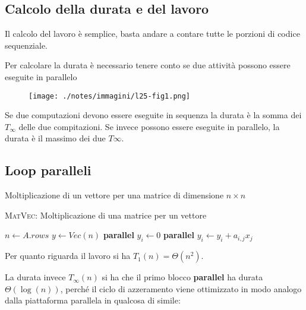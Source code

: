 
\subsection{Calcolo della durata e del lavoro}\label{calcolo-della-durata-e-del-lavoro}

Il calcolo del lavoro è semplice, basta andare a contare tutte le porzioni di codice sequenziale.

Per calcolare la durata è necessario tenere conto se due attività possono essere eseguite in parallelo

\begin{figure}[htbp]
\centering
\texttt{[image: ./notes/immagini/l25-fig1.png]}
\caption{}
\end{figure}

Se due computazioni devono essere eseguite in sequenza la durata è la somma dei $T_\infty$ delle due compitazioni. Se invece possono essere eseguite in parallelo, la durata è il massimo dei due $T\infty$.

\subsection{Loop paralleli}\label{loop-paralleli}

Moltiplicazione di un vettore per una matrice di dimensione $n \times n$

\begin{breakablealgorithm}
	\caption{\textsc{MatVec}: Moltiplicazione di una matrice per un vettore}
	\begin{algorithmic}[1]
    \State $n \gets A.rows$
    \State $y\gets Vec(n)$
    \State \textbf{parallel}
        \State $y_i \gets 0$
    \EndFor
    \State \textbf{parallel}
            \State $y_i \gets y_i + a_{i,j}x_j$
        \EndFor
    \EndFor
\EndFunction
\end{algorithmic}
\end{breakablealgorithm}


Per quanto riguarda il lavoro si ha $T_1(n) = \Theta(n^2)$.

La durata invece $T_\infty(n)$ si ha che il primo blocco \textbf{parallel} ha durata $\Theta(\log(n))$, perché il ciclo di azzeramento viene ottimizzato in modo analogo dalla piattaforma parallela in qualcosa di simile:

